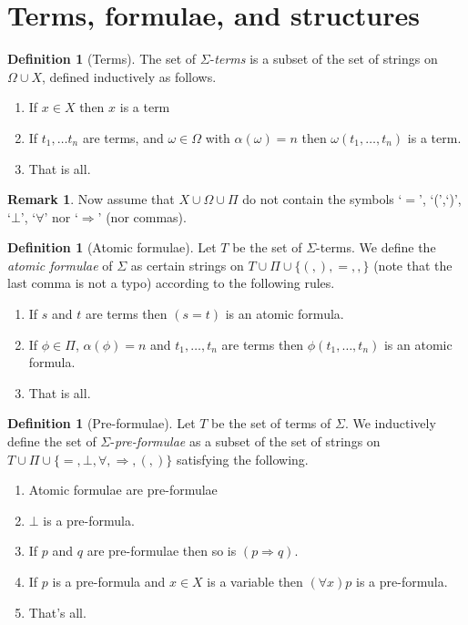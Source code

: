 \documentclass{report}
\theoremstyle{definition}
\theoremstyle{plain}
\theoremstyle{definition}
\newtheorem{defn}[thm]{Definition}
\newtheorem{rem}[thm]{Remark}
\begin{document}
	\section{Terms, formulae, and structures}
	\begin{defn}[Terms]
		The set of $\Sigma$-\emph{terms} is a subset of the set of strings on $\Omega \cup X$, defined inductively as follows. 
		\begin{enumerate}
			\item If $x\in X$ then $x$ is a term
			\item If $t_1,\ldots t_n$ are terms, and $\omega\in \Omega$ with $\alpha(\omega) = n$ then $\omega (t_1,\ldots, t_n)$ is a term.
			\item That is all.
		\end{enumerate}
	\end{defn}
	\begin{rem}
		Now assume that $X\cup \Omega \cup \Pi$ do not contain the symbols `$=$', `(',`)', `$\bot$', `$\forall$' nor `$\Rightarrow$' (nor commas).
	\end{rem} 
	\begin{defn}[Atomic formulae]
		Let $T$ be the set of $\Sigma$-terms. We define the \emph{atomic formulae} of $\Sigma$ as certain strings on $T \cup \Pi \cup \{(, ), =, ,\}$ (note that the last comma is not a typo) according to the following rules.
		\begin{enumerate}
			\item If $s$ and $t$ are terms then $(s = t)$ is an atomic formula.
			\item If $\phi \in \Pi$, $\alpha(\phi) = n$ and $t_1, \ldots, t_n$ are terms then $\phi(t_1,\ldots, t_n)$ is an atomic formula.
			\item That is all.
		\end{enumerate}
	\end{defn}
	\begin{defn}[Pre-formulae]
		Let $T$ be the set of terms of $\Sigma$. We inductively define the set of $\Sigma$-\emph{pre-formulae} as a subset of the set of strings on $T \cup \Pi\cup \{=,\bot, \forall, \Rightarrow, (, )\}$ satisfying the following.
		\begin{enumerate}
			\item Atomic formulae are pre-formulae
			\item $\bot$ is a pre-formula.
			\item If $p$ and $q$ are pre-formulae then so is $(p\Rightarrow q)$.
			\item If $p$ is a pre-formula and $x\in X$ is a variable then $(\forall x)p$ is a pre-formula.
			\item That's all.
		\end{enumerate}
	\end{defn}
	
\end{document}
